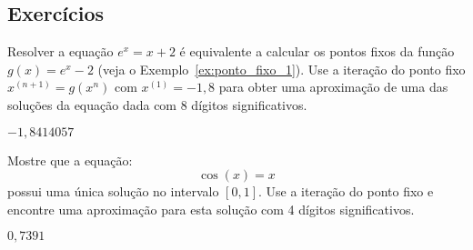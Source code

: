 \subsection*{Exercícios}

\begin{exer}
  Resolver a equação $e^x = x + 2$ é equivalente a calcular os pontos fixos da função $g(x) = e^x - 2$ (veja o Exemplo~\ref{ex:ponto_fixo_1}). Use a iteração do ponto fixo $x^{(n+1)} = g(x^{n})$ com $x^{(1)} = -1,8$ para obter uma aproximação de uma das soluções da equação dada com $8$ dígitos significativos.
\end{exer}
\begin{resp}
    $-1,8414057$
\end{resp}

\begin{exer}  Mostre que a equação:
  \begin{equation}
    \cos(x)=x
  \end{equation}
possui uma única solução no intervalo $[0, 1]$. Use a iteração do ponto fixo e encontre uma aproximação para esta solução com  4 dígitos significativos.
\end{exer}
\begin{resp}

    $0,7391$

\end{resp}

